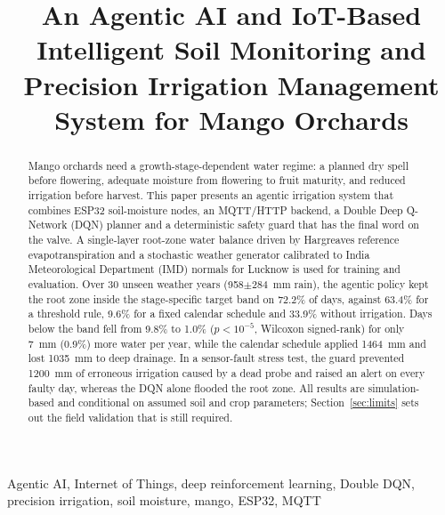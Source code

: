 \documentclass[conference]{IEEEtran}
\begin{document}
\title{An Agentic AI and IoT-Based Intelligent Soil Monitoring and Precision Irrigation Management System for Mango Orchards}

\author{
}

\maketitle

\begin{abstract}
Mango orchards need a growth-stage-dependent water regime: a planned dry spell before flowering, adequate moisture from flowering to fruit maturity, and reduced irrigation before harvest. This paper presents an agentic irrigation system that combines ESP32 soil-moisture nodes, an MQTT/HTTP backend, a Double Deep Q-Network (DQN) planner and a deterministic safety guard that has the final word on the valve. A single-layer root-zone water balance driven by Hargreaves reference evapotranspiration and a stochastic weather generator calibrated to India Meteorological Department (IMD) normals for Lucknow is used for training and evaluation. Over 30 unseen weather years (958$\pm$284~mm rain), the agentic policy kept the root zone inside the stage-specific target band on 72.2\% of days, against 63.4\% for a threshold rule, 9.6\% for a fixed calendar schedule and 33.9\% without irrigation. Days below the band fell from 9.8\% to 1.0\% ($p<10^{-5}$, Wilcoxon signed-rank) for only 7~mm (0.9\%) more water per year, while the calendar schedule applied 1464~mm and lost 1035~mm to deep drainage. In a sensor-fault stress test, the guard prevented 1200~mm of erroneous irrigation caused by a dead probe and raised an alert on every faulty day, whereas the DQN alone flooded the root zone. All results are simulation-based and conditional on assumed soil and crop parameters; Section~\ref{sec:limits} sets out the field validation that is still required.
\end{abstract}

\begin{IEEEkeywords}
Agentic AI, Internet of Things, deep reinforcement learning, Double DQN, precision irrigation, soil moisture, mango, ESP32, MQTT
\end{IEEEkeywords}
\end{document}
